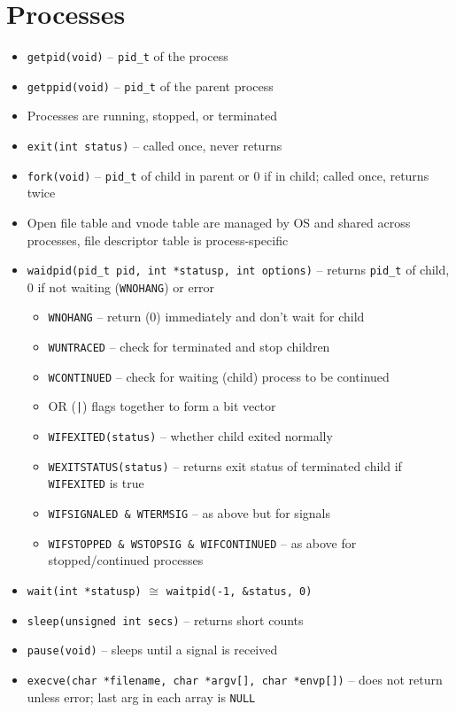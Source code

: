 \documentclass[twocolumn]{article}
\begin{document}
\section{Processes}
\begin{itemize}[noitemsep]
    \item \texttt{getpid(void)} -- \texttt{pid\_t} of the process
    \item \texttt{getppid(void)} -- \texttt{pid\_t} of the parent process
    \item Processes are running, stopped, or terminated
    \item \texttt{exit(int status)} -- called once, never returns
    \item \texttt{fork(void)} -- \texttt{pid\_t} of child in parent or 0 if in child; called once, returns twice
    \item Open file table and vnode table are managed by OS and shared across processes, file descriptor table is process-specific
    \item \texttt{waidpid(pid\_t pid, int *statusp, int options)} -- returns \texttt{pid\_t} of child, 0 if not waiting (\texttt{WNOHANG}) or error
    \begin{itemize}[noitemsep]
        \item \texttt{WNOHANG} -- return (0) immediately and don't wait for child
        \item \texttt{WUNTRACED} -- check for terminated and stop children
        \item \texttt{WCONTINUED} -- check for waiting (child) process to be continued
        \item OR (\texttt{|}) flags together to form a bit vector
        \item \texttt{WIFEXITED(status)} -- whether child exited normally
        \item \texttt{WEXITSTATUS(status)} -- returns exit status of terminated child if \texttt{WIFEXITED} is true
        \item \texttt{WIFSIGNALED \& WTERMSIG} -- as above but for signals
        \item \texttt{WIFSTOPPED \& WSTOPSIG \& WIFCONTINUED} -- as above for stopped/continued processes
    \end{itemize}
    \item \texttt{wait(int *statusp)} $\cong$ \texttt{waitpid(-1, \&status, 0)}
    \item \texttt{sleep(unsigned int secs)} -- returns short counts
    \item \texttt{pause(void)} -- sleeps until a signal is received
    \item \texttt{execve(char *filename, char *argv[], char *envp[])} -- does not return unless error; last arg in each array is \texttt{NULL}
\end{itemize}
\end{document}
